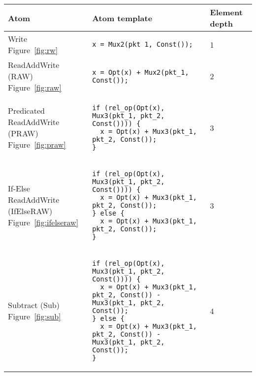 \begin{table*}[!htbp]
\begin{scriptsize}
  \center
  \begin{tabular}{|p{}|p{}|p{}|}
      \hline
      Atom & Atom template & Element depth\\
\hline
\pbox{0.1\textwidth}{Write\\Figure~\ref{fig:rw}} &
{\begin{lstlisting}[style=customctable]
x = Mux2(pkt_1, Const());
\end{lstlisting}} &
1 \\

\hline
\pbox{0.1\textwidth}{ReadAddWrite (RAW)\\Figure~\ref{fig:raw}} &
{\begin{lstlisting}[style=customctable]
x = Opt(x) + Mux2(pkt_1, Const());
\end{lstlisting}} &
2 \\

\hline
\pbox{0.1\textwidth}
{Predicated\\
ReadAddWrite (PRAW)\\Figure~\ref{fig:praw}} &
{\begin{lstlisting}[style=customctable]
if (rel_op(Opt(x), Mux3(pkt_1, pkt_2, Const()))) {
  x = Opt(x) + Mux3(pkt_1, pkt_2, Const());
}
\end{lstlisting}} &
3 \\

\hline
\pbox{0.1\textwidth}
{If-Else\\
ReadAddWrite (IfElseRAW)\\Figure~\ref{fig:ifelseraw}} &
{\begin{lstlisting}[style=customctable]
if (rel_op(Opt(x), Mux3(pkt_1, pkt_2, Const()))) {
  x = Opt(x) + Mux3(pkt_1, pkt_2, Const());
} else {
  x = Opt(x) + Mux3(pkt_1, pkt_2, Const());
}
\end{lstlisting}} &
3 \\

\hline
\pbox{0.1\textwidth}
{Subtract (Sub)\\Figure~\ref{fig:sub}} &
{\begin{lstlisting}[style=customctable]
if (rel_op(Opt(x), Mux3(pkt_1, pkt_2, Const()))) {
  x = Opt(x) + Mux3(pkt_1, pkt_2, Const()) - Mux3(pkt_1, pkt_2, Const());
} else {
  x = Opt(x) + Mux3(pkt_1, pkt_2, Const()) - Mux3(pkt_1, pkt_2, Const());
}
\end{lstlisting}}&
4 \\


\end{tabular}
\end{scriptsize}
\end{table*}

